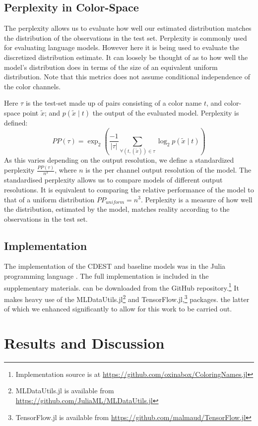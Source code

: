 \documentclass[11pt,a4paper]{article}
\newcommand{\parencite}{\citep}
\begin{document}
\subsection{Perplexity in Color-Space}
The perplexity allows us to evaluate how well our estimated distribution matches the distribution of the observations in the test set.
Perplexity is commonly used for evaluating language models. However here it is being used to evaluate the discretized distribution estimate.
It can loosely be thought of as to how well the model's distribution does in terms of the size of an equivalent uniform distribution.
Note that this metrics does not assume conditional independence of the color channels.

Here $\tau$ is the test-set made up of pairs consisting of a color name $t$, and color-space point $\tilde{x}$;
and  $p(\tilde{x}\mid t)$  the output of the evaluated model.
Perplexity is defined:
\[
 PP(\tau) = \exp_2{\left(
 	\frac{-1}{|\tau|} 
 	\sum_{
	 		\forall(t,(\tilde{x})) \in \tau}
 	 \log_2 p(\tilde{x}\mid t)\right)}
\]
As this varies depending on the output resolution,
we define a standardized perplexity $\frac{PP(\tau)}{n^3}$, where $n$ is the per channel output resolution of the model.
The standardised perplexity allows us to compare models of different output resolutions.
It is equivalent to comparing the relative performance of the model to that of a uniform distribution $PP_{uniform}=n^3$.
Perplexity is a measure of how well the distribution, estimated by the model, matches reality according to the observations in the test set.

\subsection{Implementation}
The implementation of the CDEST and baseline models was in the Julia programming language \parencite{Julia}.
The full implementation is included in the supplementary materials.
can be downloaded from the GitHub repository.\footnote{Implementation source is at \url{https://github.com/oxinabox/ColoringNames.jl}}
It makes heavy use of the MLDataUtils.jl\footnote{MLDataUtils.jl is available from \url{https://github.com/JuliaML/MLDataUtils.jl}} and TensorFlow.jl,\footnote{TensorFlow.jl is available from \url{https://github.com/malmaud/TensorFlow.jl}} packages.
the latter of which we enhanced significantly to allow for this work to be carried out.


\section{Results and Discussion}\label{sec:results-and-discussion}
\end{document}

